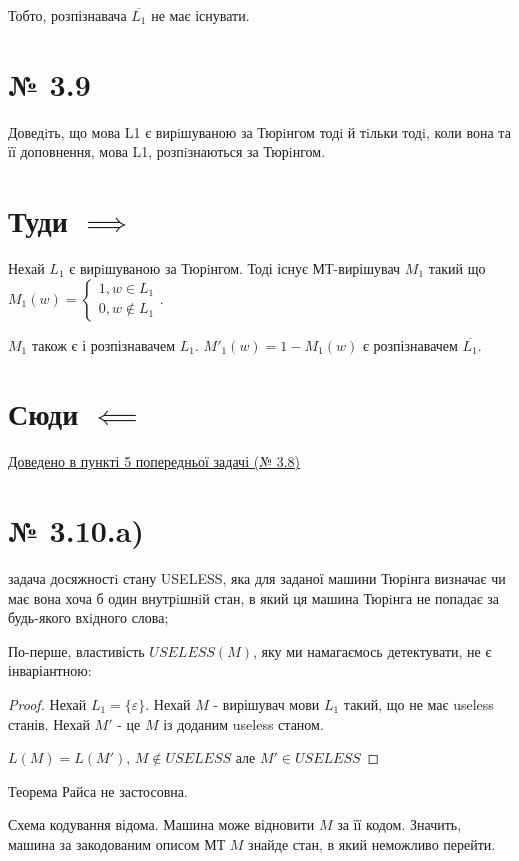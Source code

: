 \documentclass[11pt, a4paper]{article} %
\begin{document}
Тобто, розпізнавача $\overline{L_1}$ не має існувати. \qedsymbol

\section*{№ 3.9}
\begin{mdframed}
    Доведiть, що мова L1 є вирiшуваною за Тюрiнгом тодi й тiльки тодi, коли
вона та її доповнення, мова L1, розпiзнаються за Тюрiнгом.
\end{mdframed}

\section*{Туди $\implies$}
Нехай $L_1$ є вирiшуваною за Тюрiнгом. 
Тоді існує МТ-вирішувач $M_1$ такий що $M_1(w) = \begin{cases}
    1, w \in L_1\\
    0, w \notin L_1
\end{cases}$.

$M_1$ також є і розпізнавачем $L_1$.
$M'_1(w) = 1 - M_1(w)$ є розпізнавачем $\overline{L_1}$.
\qedsymbol

\section*{Сюди $\impliedby$}
\hyperref[3.8.5]{Доведено в пункті 5 попередньої задачі (№ 3.8)}

\section*{№ 3.10.a)}
\begin{mdframed}
    задача досяжностi стану USELESS, яка для заданої машини Тюрiнга
визначає чи має вона хоча б один внутрiшнiй стан, в який ця машина
Тюрiнга не попадає за будь-якого вхiдного слова;
\end{mdframed}

По-перше, властивість $USELESS(M)$, яку ми намагаємось детектувати, не є інваріантною:
\begin{proof}
    Нехай $L_1 = \{\varepsilon\}$.
    Нехай $M$ - вирішувач мови $L_1$ такий, що не має useless станів.
    Нехай $M'$ - це $M$ із доданим useless станом.
    
    $L(M) = L(M')$, $M \notin USELESS$ але $M' \in USELESS$
\end{proof}
Теорема Райса не застосовна.

Схема кодування відома. Машина може відновити $M$ за її кодом. 
Значить, машина за закодованим описом МТ $M$ знайде стан, в який неможливо перейти. 
\end{document}
